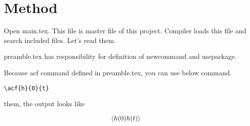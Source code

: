 \section{Method}

Open main.tex. This file is master file of this project. Compiler loads this file and search included files. Let's read them.

preamble.tex has responsibility for definition of newcommand and usepackage.

Because acf command defined in preamble.tex, you can use below command.

\begin{lstlisting}
\acf{h}{0}{t}
\end{lstlisting}

them, the output looks like

\begin{equation}
  \left< h(0) h(t) \right>
\end{equation}
